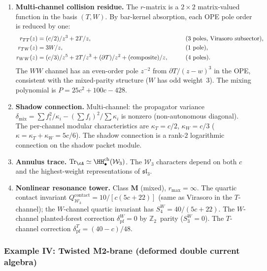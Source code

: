 \begin{computation}
\begin{enumerate}[label=\textup{(\roman*)},nosep]
\item \textbf{Multi-channel collision residue.}
 The $r$-matrix is a $2 \times 2$ matrix-valued function
 in the basis $(T, W)$.
 By bar-kernel absorption, each OPE pole order is reduced by one:
 \begin{alignat}{2}\label{eq:platonic-r-W3}
 r_{TT}(z) &= (c/2)/z^3 + 2T/z,
 &\qquad&\text{(3 poles, Virasoro subsector),}
 \notag\\
 r_{TW}(z) &= 3W/z,
 &&\text{(1 pole),}
 \notag\\
 r_{WW}(z) &= (c/3)/z^5 + 2T/z^3 + (\partial T)/z^2
 + (\text{composite})/z,
 &&\text{(4 poles).}
 \end{alignat}
 The $WW$ channel has an even-order pole $z^{-2}$ from
 $\partial T/(z-w)^3$ in the OPE, consistent with the
 mixed-parity structure ($W$ has odd weight~$3$).
 The mixing polynomial is $P = 25c^2 + 100c - 428$.

\item \textbf{Shadow connection.}
 Multi-channel: the propagator variance
 $\delta_{\mathrm{mix}} = \sum f_i^2/\kappa_i - (\sum f_i)^2/\sum\kappa_i$
 is nonzero (non-autonomous diagonal). The per-channel
 modular characteristics are
 $\kappa_T = c/2$, $\kappa_W = c/3$
 \textup{(}$\kappa = \kappa_T + \kappa_W = 5c/6$\textup{)}.
 The shadow connection is a rank-$2$ logarithmic connection on
 the shadow packet module.

\item \textbf{Annulus trace.}
 $\mathrm{Tr}_\cA \simeq \HH^{\mathrm{ch}}_\bullet(\mathcal{W}_3)$.
 The $\mathcal{W}_3$ characters depend on both $c$ and the
 highest-weight representations of $\mathfrak{sl}_3$.

\item \textbf{Nonlinear resonance tower.}
 Class $\mathbf{M}$ (mixed), $r_{\max} = \infty$.
 The quartic contact invariant
 $Q^{\mathrm{contact}}_{\mathcal{W}_3} = 10/[c(5c+22)]$
 \textup{(}same as Virasoro in the $T$-channel\textup{)};
 the $W$-channel quartic invariant has
 $S_4^W = 40/(5c+22)$.
 The $W$-channel planted-forest correction
 $\delta_{\mathrm{pf}}^W = 0$ by
 $\mathbb{Z}_2$~parity ($S_3^W = 0$).
 The $T$-channel correction
 $\delta_{\mathrm{pf}}^T = (40 - c)/48$.
\end{enumerate}
\end{computation}


\subsubsection{Example IV: Twisted M2-brane (deformed double current algebra)}
\label{subsubsec:platonic-M2}

